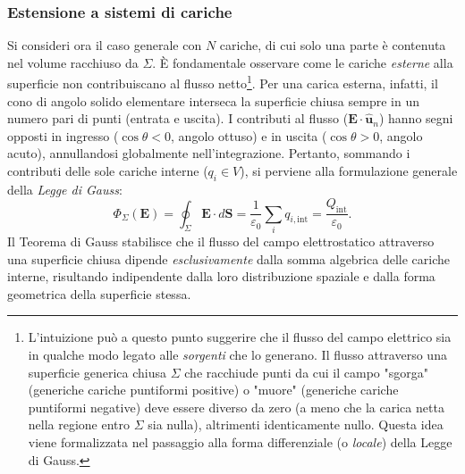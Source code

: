 \documentclass[a4paper,11pt]{report}
\begin{document}
\subsubsection{Estensione a sistemi di cariche}
Si consideri ora il caso generale con $N$ cariche, di cui solo una parte è contenuta nel volume racchiuso da $\Sigma$.
È fondamentale osservare come le cariche \textit{esterne} alla superficie non contribuiscano al flusso netto\footnote{L'intuizione può a questo punto suggerire che il flusso del campo elettrico sia in qualche modo legato alle \emph{sorgenti} che lo generano. Il flusso attraverso una superficie generica chiusa $\Sigma$ che racchiude punti da cui il campo "sgorga" (generiche cariche puntiformi positive) o "muore" (generiche cariche puntiformi negative) deve essere diverso da zero (a meno che la carica netta nella regione entro $\Sigma$ sia nulla), altrimenti identicamente nullo. Questa idea viene formalizzata nel passaggio alla forma differenziale (o \emph{locale}) della Legge di Gauss.\label{pensiero}}. Per una carica esterna, infatti, il cono di angolo solido elementare interseca la superficie chiusa sempre in un numero pari di punti (entrata e uscita). I contributi al flusso ($\bm{E}\cdot\hat{\bm{u}}_n$) hanno segni opposti in ingresso ($\cos\theta < 0$, angolo ottuso) e in uscita ($\cos\theta > 0$, angolo acuto), annullandosi globalmente nell'integrazione.
Pertanto, sommando i contributi delle sole cariche interne ($q_i \in V$), si perviene alla formulazione generale della \textit{Legge di Gauss}:
\begin{equation}
    \boxed{\Phi_{\Sigma}(\bm{E}) = \oint_{\Sigma} \bm{E} \cdot d\bm{S} = \frac{1}{\varepsilon_0} \sum_{i} q_{i, \text{int}} = \frac{Q_{\text{int}}}{\varepsilon_0}}.
    \label{eq:teorema_gauss}
\end{equation}
Il Teorema di Gauss stabilisce che il flusso del campo elettrostatico attraverso una superficie chiusa dipende \textit{esclusivamente} dalla somma algebrica delle cariche interne, risultando indipendente dalla loro distribuzione spaziale e dalla forma geometrica della superficie stessa.
\end{document}
